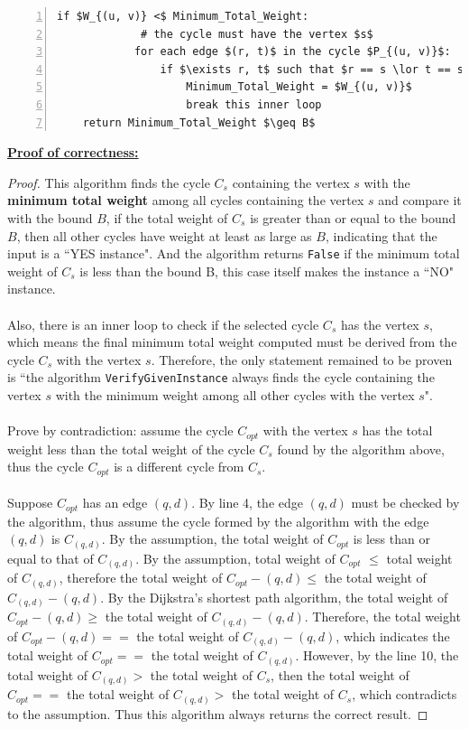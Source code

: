 \documentclass[10pt]{article}
\begin{document}
\begin{itemize}
\begin{mdframed}
\begin{lstlisting}[mathescape=true, numbers=left]
        if $W_{(u, v)} <$ Minimum_Total_Weight:
             # the cycle must have the vertex $s$
            for each edge $(r, t)$ in the cycle $P_{(u, v)}$:
                if $\exists r, t$ such that $r == s \lor t == s$:
                    Minimum_Total_Weight = $W_{(u, v)}$
                    break this inner loop
    return Minimum_Total_Weight $\geq B$
            \end{lstlisting}
    \underline{\textbf{Proof of correctness:}}
    \begin{proof}
    This algorithm finds the cycle $C_s$ containing the vertex $s$ with the \textbf{minimum total weight} among all cycles containing the vertex $s$ and compare it with the bound $B$, if the total weight of $C_s$ is greater than or equal to the bound $B$, then all other cycles have weight at least as large as $B$, indicating that the input is a ``YES instance". And the algorithm returns \texttt{False} if the minimum total weight of $C_s$ is less than the bound B, this case itself makes the instance a ``NO" instance.\\
    \\
    Also, there is an inner loop to check if the selected cycle $C_s$ has the vertex $s$, which means the final minimum total weight computed must be derived from  the cycle $C_s$ with the vertex $s$. Therefore, the only statement remained to be proven is ``the algorithm \texttt{VerifyGivenInstance} always finds the cycle containing the vertex $s$ with the minimum weight among all other cycles with the vertex $s$".\\
    \\
    Prove by contradiction: assume the cycle $C_{opt}$ with the vertex $s$ has the total weight less than the total weight of the cycle $C_s$ found by the algorithm above, thus the cycle $C_{opt}$ is a different cycle from $C_s$.\\
    \\
    Suppose $C_{opt}$ has an edge $(q, d)$. By line 4, the edge $(q, d)$ must be checked by the algorithm, thus assume the cycle formed by the algorithm with the edge $(q, d)$ is $C_{(q,d)}$. By the assumption, the total weight of $C_{opt}$ is less than or equal to that of $C_{(q, d)}$. By the assumption, total weight of $C_{opt}$ $\leq$ total weight of $C_{(q, d)}$, therefore the total weight of $C_{opt} - (q, d) \leq$ the total weight of $C_{(q, d)} - (q, d)$. By the Dijkstra's shortest path algorithm, the total weight of $C_{opt} - (q, d) \geq$ the total weight of $C_{(q, d)} - (q, d)$. Therefore, the total weight of $C_{opt} - (q, d) ==$ the total weight of $C_{(q, d)} - (q, d)$, which indicates the total weight of $C_{opt} ==$ the total weight of $C_{(q, d)}$. However, by the line 10, the total weight of $C_{(q, d)} >$ the total weight of $C_s$, then the total weight of $C_{opt} == $ the total weight of $C_{(q, d)} >$ the total weight of $C_s$, which contradicts to the assumption. Thus this algorithm always returns the correct result.\end{proof}\\

\end{mdframed}
\end{itemize}
\end{document}
